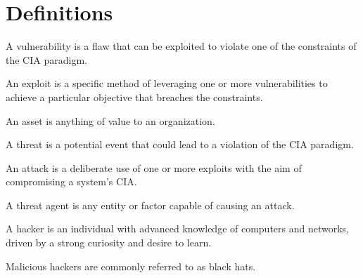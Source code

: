\section{Definitions}

\begin{definition}
    A vulnerability is a flaw that can be exploited to violate one of the constraints of the CIA paradigm.
\end{definition}

\begin{definition}
    An exploit is a specific method of leveraging one or more vulnerabilities to achieve a particular objective that breaches the constraints.
\end{definition}

\begin{definition}
    An asset is anything of value to an organization.
\end{definition}

\begin{definition}
    A threat is a potential event that could lead to a violation of the CIA paradigm.
\end{definition}

\begin{definition}
    An attack is a deliberate use of one or more exploits with the aim of compromising a system's CIA.
\end{definition}

\begin{definition}
    A threat agent is any entity or factor capable of causing an attack.
\end{definition}

\begin{definition}
    A hacker is an individual with advanced knowledge of computers and networks, driven by a strong curiosity and desire to learn.
\end{definition}

\begin{definition}
    Malicious hackers are commonly referred to as black hats.
\end{definition}